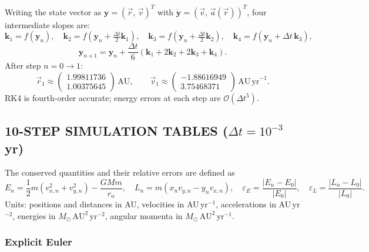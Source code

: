 Writing the state vector as $\mathbf{y} = (\vec{r},\,\vec{v})^T$ with
$\dot{\mathbf{y}} = (\vec{v},\,\vec{a}(\vec{r}))^T$, four intermediate slopes are:
\begin{equation*}
    \mathbf{k}_1 = f(\mathbf{y}_n),\quad
    \mathbf{k}_2 = f\!\left(\mathbf{y}_n + \tfrac{\Delta t}{2}\mathbf{k}_1\right),\quad
    \mathbf{k}_3 = f\!\left(\mathbf{y}_n + \tfrac{\Delta t}{2}\mathbf{k}_2\right),\quad
    \mathbf{k}_4 = f(\mathbf{y}_n + \Delta t\,\mathbf{k}_3),
\end{equation*}
\begin{equation*}
    \mathbf{y}_{n+1} = \mathbf{y}_n + \frac{\Delta t}{6}\!\left(\mathbf{k}_1 + 2\mathbf{k}_2 + 2\mathbf{k}_3 + \mathbf{k}_4\right).
\end{equation*}
After step $n = 0 \to 1$:
\begin{equation*}
    \vec{r}_1 \approx \begin{pmatrix}1.99811736\\1.00375645\end{pmatrix}\,\mathrm{AU},\qquad
    \vec{v}_1 \approx \begin{pmatrix}-1.88616949\\3.75468371\end{pmatrix}\,\mathrm{AU\,yr}^{-1}.
\end{equation*}
RK4 is fourth-order accurate; energy errors at each step are $\mathcal{O}(\Delta t^5)$.

\subsection{10-STEP SIMULATION TABLES ($\Delta t = 10^{-3}$\,yr)}

The conserved quantities and their relative errors are defined as
\begin{equation}
    E_n = \frac{1}{2}m\!\left(v_{x,n}^2 + v_{y,n}^2\right) - \frac{GMm}{r_n},
    \quad
    L_n = m\!\left(x_n v_{y,n} - y_n v_{x,n}\right),
    \quad
    \varepsilon_E = \frac{|E_n - E_0|}{|E_0|},
    \quad
    \varepsilon_L = \frac{|L_n - L_0|}{|L_0|}.
\end{equation}
Units: positions and distances in AU, velocities in AU\,yr$^{-1}$, accelerations in AU\,yr$^{-2}$,
energies in $M_\odot\,\mathrm{AU}^2\,\mathrm{yr}^{-2}$, angular momenta in $M_\odot\,\mathrm{AU}^2\,\mathrm{yr}^{-1}$.

\subsubsection*{Explicit Euler}

